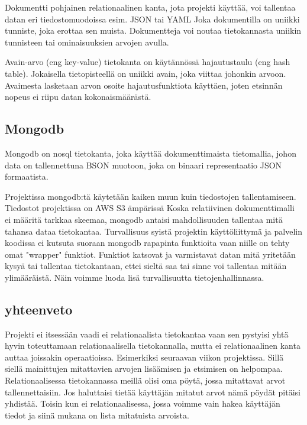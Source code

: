 Dokumentti pohjainen relationaalinen kanta, jota projekti käyttää, voi tallentaa datan eri tiedostomuodoissa esim. JSON tai YAML
Joka dokumentilla on uniikki tunniste, joka erottaa sen muista. 
Dokumentteja voi noutaa tietokannasta uniikin tunnisteen tai ominaisuuksien arvojen avulla.
\medskip

Avain-arvo (eng key-value) tietokanta on käytännössä hajautustaulu (eng hash table).
Jokaisella tietopisteellä on uniikki avain, joka viittaa johonkin arvoon. 
Avaimesta lasketaan arvon osoite hajautusfunktiota käyttäen, joten etsinnän nopeus ei riipu datan kokonaismäärästä.
\medskip




\subsection*{Mongodb}

Mongodb on nosql tietokanta, joka käyttää dokumenttimaista tietomallia, johon data on tallennettuna BSON muotoon, joka on binaari representaatio JSON formaatista.
\medskip

Projektissa mongodb:tä käytetään kaiken muun kuin tiedostojen tallentamiseen. Tiedostot projektissa on AWS S3 ämpärissä
Koska relatiivinen dokumenttimalli ei määritä tarkkaa skeemaa, mongodb antaisi mahdollisuuden tallentaa mitä tahansa dataa tietokantaa.
Turvallisuus syistä projektin käyttöliittymä ja palvelin koodissa ei kutsuta suoraan mongodb rapapinta funktioita vaan niille on tehty omat "wrapper"{} funktiot.
Funktiot katsovat ja varmistavat datan mitä yritetään kysyä tai tallentaa tietokantaan, ettei sieltä saa tai sinne voi tallentaa mitään ylimääräistä.
Näin voimme luoda lisä turvallisuutta tietojenhallinnassa.
\medskip



\subsection*{yhteenveto}


Projekti ei itsessään vaadi ei relationaalista tietokantaa vaan sen pystyisi yhtä hyvin toteuttamaan relationaalisella tietokannalla, 
mutta ei relationaalinen kanta auttaa joissakin operaatioissa.
Esimerkiksi seuraavan viikon projektissa. Sillä siellä mainittujen mitattavien arvojen lisäämisen ja etsimisen on helpompaa.
Relationaalisessa tietokannassa meillä olisi oma pöytä, jossa mitattavat arvot tallennettaisiin.
Jos haluttaisi tietää käyttäjän mitatut arvot nämä pöydät pitäisi yhdistää.
Toisin kun ei relationaalisessa, jossa voimme vain hakea käyttäjän tiedot ja siinä mukana on lista mitatuista arvoista.



